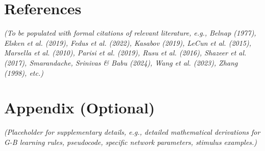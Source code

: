 \documentclass{article}
\begin{document}
\section{References}
\textit{(To be populated with formal citations of relevant literature, e.g., Belnap (1977), Elsken et al. (2019), Fedus et al. (2022), Kasabov (2019), LeCun et al. (2015), Marsella et al. (2010), Parisi et al. (2019), Rusu et al. (2016), Shazeer et al. (2017), Smarandache, Srinivas \& Babu (2024), Wang et al. (2023), Zhang (1998), etc.)}

\section{Appendix (Optional)}
\textit{(Placeholder for supplementary details, e.g., detailed mathematical derivations for G-B learning rules, pseudocode, specific network parameters, stimulus examples.)}
\end{document}
